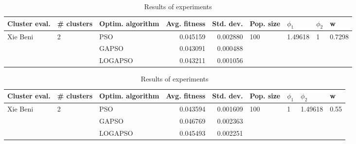 \documentclass{article}
\begin{document}
\begin{table}
\centering
\caption{Results of experiments}
\begin{tabular}{lllrrllll}
\toprule
            Cluster eval. &        \# clusters & Optim. algorithm &  Avg. fitness &  Std. dev. &            Pop. size &               $\phi_{1}$ &         $\phi_{2}$ &                       w \\
\midrule
\multirow{3}{*}{Xie Beni} & \multirow{3}{*}{2} &              PSO &      0.045159 &   0.002880 & \multirow{3}{*}{100} & \multirow{3}{*}{1.49618} & \multirow{3}{*}{1} & \multirow{3}{*}{0.7298} \\
                          &                    &            GAPSO &      0.043091 &   0.000488 &                      &                          &                    &                         \\
                          &                    &          LOGAPSO &      0.043211 &   0.001056 &                      &                          &                    &                         \\
\bottomrule
\end{tabular}
\end{table}
\begin{table}
\centering
\caption{Results of experiments}
\begin{tabular}{lllrrllll}
\toprule
            Cluster eval. &        \# clusters & Optim. algorithm &  Avg. fitness &  Std. dev. &            Pop. size &         $\phi_{1}$ &               $\phi_{2}$ &                     w \\
\midrule
\multirow{3}{*}{Xie Beni} & \multirow{3}{*}{2} &              PSO &      0.043594 &   0.001609 & \multirow{3}{*}{100} & \multirow{3}{*}{1} & \multirow{3}{*}{1.49618} & \multirow{3}{*}{0.55} \\
                          &                    &            GAPSO &      0.046769 &   0.002363 &                      &                    &                          &                       \\
                          &                    &          LOGAPSO &      0.045493 &   0.002251 &                      &                    &                          &                       \\
\bottomrule
\end{tabular}
\end{table}
\end{document}
